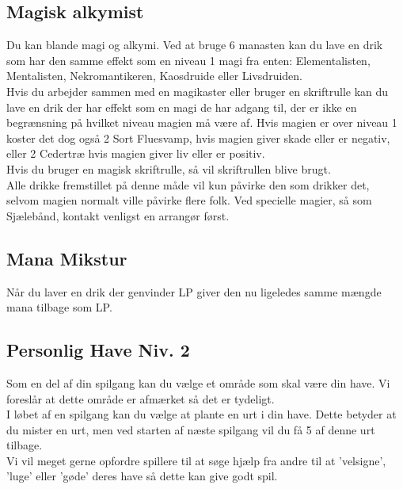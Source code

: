 \subsection*{Magisk alkymist}
Du kan blande magi og alkymi. Ved at bruge 6 manasten kan du lave en drik som har den samme effekt som en niveau 1 magi fra enten: Elementalisten, Mentalisten, Nekromantikeren, Kaosdruide eller Livsdruiden.\\
Hvis du arbejder sammen med en magikaster eller bruger en skriftrulle kan du lave en drik der har effekt som en magi de har adgang til, der er ikke en begrænsning på hvilket niveau magien må være af. Hvis magien er over niveau 1 koster det dog også 2 Sort Fluesvamp, hvis magien giver skade eller er negativ, eller 2 Cedertræ hvis magien giver liv eller er positiv.\\
Hvis du bruger en magisk skriftrulle, så vil skriftrullen blive brugt.\\
Alle drikke fremstillet på denne måde vil kun påvirke den som drikker det, selvom magien normalt ville påvirke flere folk. Ved specielle magier, så som Sjælebånd, kontakt venligst en arrangør først.\\

\subsection*{Mana Mikstur}
Når du laver en drik der genvinder LP giver den nu ligeledes samme mængde mana tilbage som LP.\\

\subsection*{Personlig Have Niv. 2}
Som en del af din spilgang kan du vælge et område som skal være din have. Vi foreslår at dette område er afmærket så det er tydeligt.\\
I løbet af en spilgang kan du vælge at plante en urt i din have. Dette betyder at du mister en urt, men ved starten af næste spilgang vil du få 5 af denne urt tilbage.\\
Vi vil meget gerne opfordre spillere til at søge hjælp fra andre til at 'velsigne', 'luge' eller 'gøde' deres have så dette kan give godt spil.\\

